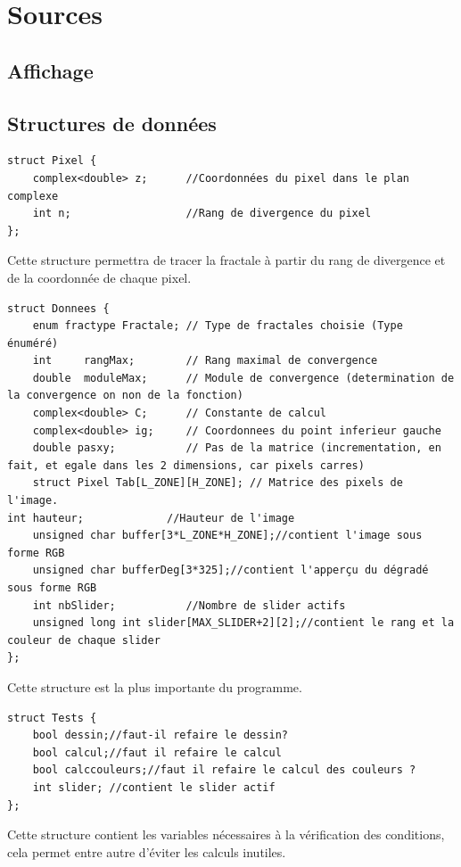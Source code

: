 \documentclass[a4paper,11pt]{article} \usepackage[T1]{fontenc} \usepackage[utf8]{inputenc} \usepackage[francais]{babel}
\begin{document}
\section{Sources}

\subsection{Affichage}%

\subsection{Structures de données}
\begin{lstlisting}
struct Pixel {
    complex<double> z;      //Coordonnées du pixel dans le plan complexe
    int n;                  //Rang de divergence du pixel
};
\end{lstlisting}
Cette structure permettra de tracer la fractale à partir du rang de divergence et de la coordonnée de chaque pixel.
\begin{lstlisting}
struct Donnees {
    enum fractype Fractale; // Type de fractales choisie (Type énuméré)
    int     rangMax;        // Rang maximal de convergence
    double  moduleMax;      // Module de convergence (determination de la convergence on non de la fonction)
    complex<double> C;      // Constante de calcul
    complex<double> ig;     // Coordonnees du point inferieur gauche
    double pasxy;           // Pas de la matrice (incrementation, en fait, et egale dans les 2 dimensions, car pixels carres)
    struct Pixel Tab[L_ZONE][H_ZONE]; // Matrice des pixels de l'image.
int hauteur;             //Hauteur de l'image
    unsigned char buffer[3*L_ZONE*H_ZONE];//contient l'image sous forme RGB
    unsigned char bufferDeg[3*325];//contient l'apperçu du dégradé sous forme RGB
    int nbSlider;           //Nombre de slider actifs
    unsigned long int slider[MAX_SLIDER+2][2];//contient le rang et la couleur de chaque slider
};

\end{lstlisting}
Cette structure est la plus importante du programme.

\begin{lstlisting}
struct Tests {
    bool dessin;//faut-il refaire le dessin?
    bool calcul;//faut il refaire le calcul
    bool calccouleurs;//faut il refaire le calcul des couleurs ?
    int slider; //contient le slider actif
};
\end{lstlisting}
Cette structure contient les variables nécessaires à la vérification des conditions, cela permet entre autre d’éviter les calculs inutiles.
\end{document}
